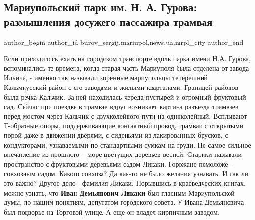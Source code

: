  
 
 
 
 
 
\subsection{Мариупольский парк им. Н. А. Гурова: размышления досужего пассажира трамвая}
\label{sec:16_03_2019.stz.news.ua.mrpl_city.1.park_gurova_razmyshlenia_dosuzhego_passazhira_tramvaja}
 
\ifcmt
 author_begin
   author_id burov_sergij.mariupol,news.ua.mrpl_city
 author_end
\fi

Если приходилось ехать на городском транспорте вдоль парка имени Н.А. Гурова,
вспоминались те времена, когда старая часть Мариуполя была отделена от завода
Ильича, - именно так называли коренные мариупольцы теперешний Кальмиусский
район с его заводами и жилыми кварталами. Границей районов была речка Кальчик.
За ней находилась череда пустырей и огромный фруктовый сад. Сейчас при поездке
в трамвае вдруг возникает картина разъезда трамваев перед мостом через Кальчик
с двухколейного пути на одноколейный. Всплывают      Т-образные опоры,
поддерживающие контактный провод, трамваи с открытыми порой даже в движении
дверями, с сиденьями из лакированных брусков, с кондукторами, узнаваемыми по
стандартными сумкам на груди. Но самое сильное впечатление из прошлого – море
цветущих деревьев весной. Старики называли пространство с фруктовыми деревьями
садом Ликаки. Горожане помоложе – совхозным садом. Какого совхоза? Да как-то не
было желания узнавать. И так ли это важно? Другое дело - фамилия Ликаки.
Порывшись в краеведческих книгах, можно узнать, что \textbf{Иван Демьянович Ликаки} был
гласным Мариупольской думы, по нашим понятиям, депутатом городского совета. У
Ивана Демьяновича был подворье на Торговой улице. А еще он владел кирпичным
заводом.

